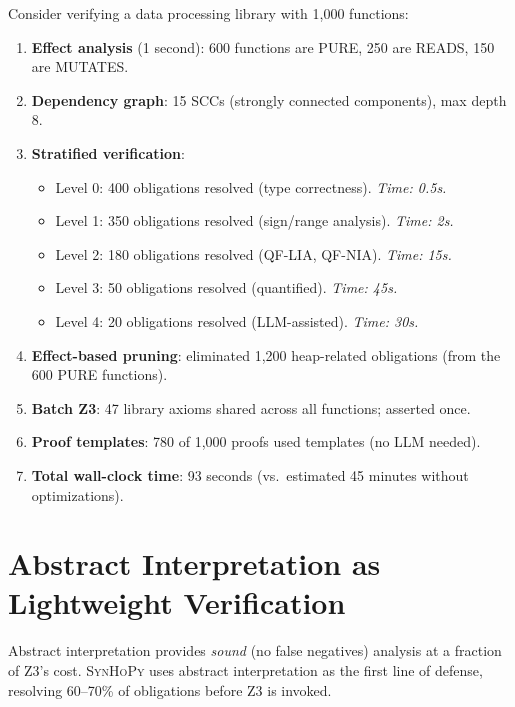 \documentclass[11pt,a4paper]{report}
\theoremstyle{definition}
\theoremstyle{plain}
\newcommand{\synhopy}{\textsc{SynHoPy}}
\begin{document}
Consider verifying a data processing library with 1,000 functions:
\begin{enumerate}
  \item \textbf{Effect analysis} (1 second): 600 functions are PURE, 250 are READS, 150 are MUTATES.
  \item \textbf{Dependency graph}: 15 SCCs (strongly connected components), max depth 8.
  \item \textbf{Stratified verification}:
    \begin{itemize}
      \item Level 0: 400 obligations resolved (type correctness). \emph{Time: 0.5s.}
      \item Level 1: 350 obligations resolved (sign/range analysis). \emph{Time: 2s.}
      \item Level 2: 180 obligations resolved (QF-LIA, QF-NIA). \emph{Time: 15s.}
      \item Level 3: 50 obligations resolved (quantified). \emph{Time: 45s.}
      \item Level 4: 20 obligations resolved (LLM-assisted). \emph{Time: 30s.}
    \end{itemize}
  \item \textbf{Effect-based pruning}: eliminated 1,200 heap-related obligations (from the 600 PURE functions).
  \item \textbf{Batch Z3}: 47 library axioms shared across all functions; asserted once.
  \item \textbf{Proof templates}: 780 of 1,000 proofs used templates (no LLM needed).
  \item \textbf{Total wall-clock time}: 93 seconds (vs.\ estimated 45 minutes without optimizations).
\end{enumerate}



\chapter{Abstract Interpretation as Lightweight Verification}
\label{ch:abstract-interp}

Abstract interpretation provides \emph{sound} (no false negatives) analysis at
a fraction of Z3's cost.  \synhopy{} uses abstract interpretation as the first
line of defense, resolving 60--70\% of obligations before Z3 is invoked.
\end{document}
